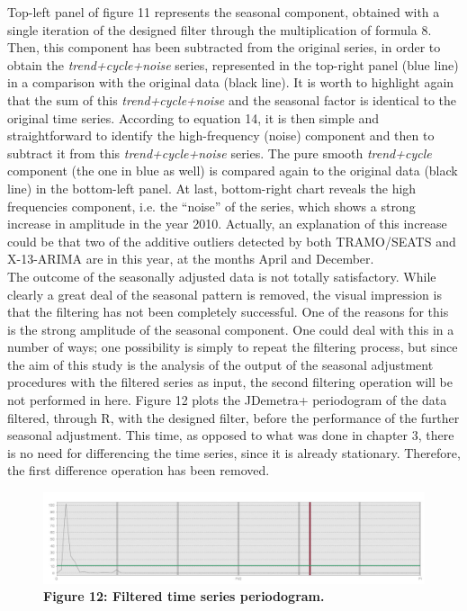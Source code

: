 \documentclass{article}
\begin{document}
Top-left panel of figure 11 represents the seasonal component, obtained with a single iteration of the designed filter through the multiplication of formula 8. Then, this component has been subtracted from the original series, in order to obtain the \textit{trend+cycle+noise} series, represented in the top-right panel (blue line) in a comparison with the original data (black line). It is worth to highlight again that the sum of this \textit{trend+cycle+noise} and the seasonal factor is identical to the original time series. According to equation 14, it is then simple and straightforward to identify the high-frequency (noise) component and then to subtract it from this \textit{trend+cycle+noise} series. The pure smooth \textit{trend+cycle} component (the one in blue as well) is compared again to the original data (black line) in the bottom-left panel. At last, bottom-right chart reveals the high frequencies component, i.e. the ``noise'' of the series, which shows a strong increase in amplitude in the year 2010. Actually, an explanation of this increase could be that two of the additive outliers detected by both TRAMO/SEATS and X-13-ARIMA are in this year, at the months April and December.\\The outcome of the seasonally adjusted data is not totally satisfactory. While clearly a great deal of the seasonal pattern is removed, the visual impression is that the filtering has not been completely successful. One of the reasons for this is the strong amplitude of the seasonal component. One could deal with this in a number of ways; one possibility is simply to repeat the filtering process, but since the aim of this study is the analysis of the output of the seasonal adjustment procedures with the filtered series as input, the second filtering operation will be not performed in here. Figure 12 plots the JDemetra+ periodogram of the data filtered, through R, with the designed filter, before the performance of the further seasonal adjustment. This time, as opposed to what was done in chapter 3, there is no need for differencing the time series, since it is already stationary. Therefore, the first difference operation has been removed.\\ 
\begin{figure}[H]
\centering
  \includegraphics[width=\textwidth]{../images/capitolo4/tc_periodogram.jpg}
  {\textbf{\scriptsize Figure 12: Filtered time series periodogram.}}
\end{figure}
\end{document}
